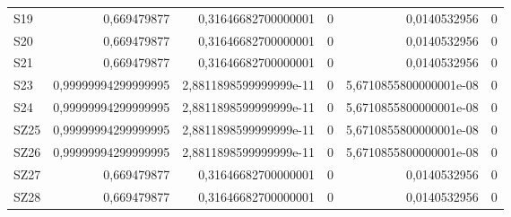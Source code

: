 \begin{longtable}{lrrrrr}
S19 & 0,669479877 & 0,31646682700000001 & 0 & 0,0140532956 & 0 \\
S20 & 0,669479877 & 0,31646682700000001 & 0 & 0,0140532956 & 0 \\
S21 & 0,669479877 & 0,31646682700000001 & 0 & 0,0140532956 & 0 \\
S23 & 0,99999994299999995 & 2,8811898599999999e-11 & 0 & 5,6710855800000001e-08 & 0 \\
S24 & 0,99999994299999995 & 2,8811898599999999e-11 & 0 & 5,6710855800000001e-08 & 0 \\
SZ25 & 0,99999994299999995 & 2,8811898599999999e-11 & 0 & 5,6710855800000001e-08 & 0 \\
SZ26 & 0,99999994299999995 & 2,8811898599999999e-11 & 0 & 5,6710855800000001e-08 & 0 \\
SZ27 & 0,669479877 & 0,31646682700000001 & 0 & 0,0140532956 & 0 \\
SZ28 & 0,669479877 & 0,31646682700000001 & 0 & 0,0140532956 & 0 \\
\hline
\end{longtable}